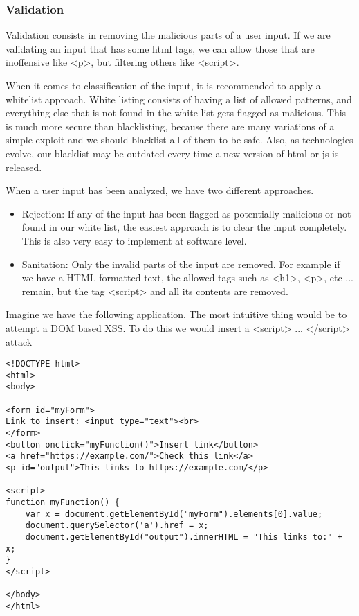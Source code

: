 \subsubsection{Validation}
Validation consists in removing the malicious parts of a user input. If we are validating an input that has some html tags, we can allow those that are inoffensive like <p>, but filtering others like <script>.

When it comes to classification of the input, it is recommended to apply a whitelist approach. White listing consists of having a list of allowed patterns, and everything else that is not found in the white list gets flagged as malicious. This is much more secure than blacklisting, because there are many variations of a simple exploit and we should blacklist all of them to be safe. Also, as technologies evolve, our blacklist may be outdated every time a new version of html or js is released. 

When a user input has been analyzed, we have two different approaches.

\begin{itemize}
\item Rejection: If any of the input has been flagged as potentially malicious or not found in our white list, the easiest approach is to clear the input completely. This is also very easy to implement at software level. 

\item Sanitation: Only the invalid parts of the input are removed. For example if we have a HTML formatted text, the allowed tags such as <h1>, <p>, etc ...  remain, but the tag <script> and all its contents are removed.
\end{itemize}

Imagine we have the following application. The most intuitive thing would be to attempt a DOM based XSS. To do this we would insert a <script> ... </script> attack
\begin{lstlisting}[style=JavaScript]
<!DOCTYPE html>
<html>
<body>

<form id="myForm">
Link to insert: <input type="text"><br>
</form> 
<button onclick="myFunction()">Insert link</button>
<a href="https://example.com/">Check this link</a>
<p id="output">This links to https://example.com/</p>

<script>
function myFunction() {
	var x = document.getElementById("myForm").elements[0].value;
	document.querySelector('a').href = x;
	document.getElementById("output").innerHTML = "This links to:" + x;
}
</script>

</body>
</html>

\end{lstlisting}




